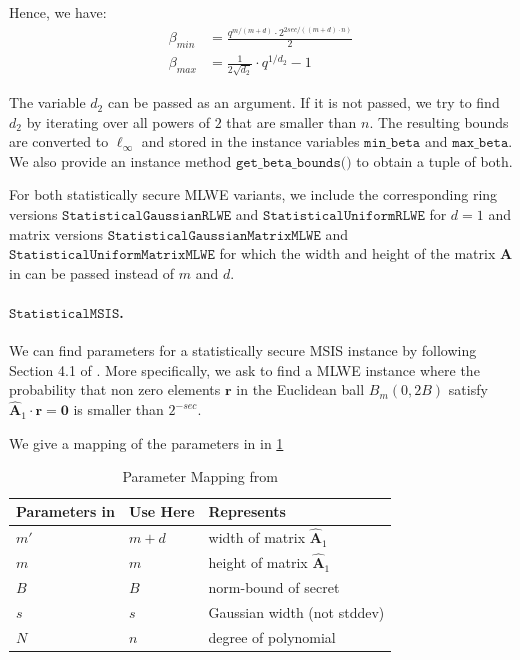 Hence, we have:
\begin{align}
    \beta_{min} & = \frac{q^{m/(m+d)} \cdot 2^{2 sec/((m+d)\cdot n)}}{2} \\
    \beta_{max} & = \frac{1}{2\sqrt{d_2}} \cdot q^{1/d_2} - 1
\end{align}

The variable $d_2$ can be passed as an argument. If it is not passed, we try to find $d_2$ by iterating over all powers of $2$ that are smaller than $n$.
The resulting bounds are converted to $\ell_\infty$ and stored in the instance variables $\texttt{min\_beta}$ and $\texttt{max\_beta}$. We also provide an instance method $\texttt{get\_beta\_bounds()}$ to obtain a tuple of both.

For both statistically secure MLWE variants, we include the corresponding ring versions $\texttt{StatisticalGaussianRLWE}$ and $\texttt{StatisticalUniformRLWE}$ for $d=1$ and matrix versions $\texttt{StatisticalGaussianMatrixMLWE}$ and $\texttt{StatisticalUniformMatrixMLWE}$ for which the width and height of the matrix $\mathbf{A}$ in \cite{LPR13} can be passed instead of $m$ and $d$. %


\paragraph{$\texttt{StatisticalMSIS}$.} We can find parameters for a statistically secure MSIS instance by following Section 4.1 of \cite{DOTT21}. More specifically, we ask to find a MLWE instance where the probability that non zero elements $\mathbf{r}$ in the Euclidean ball $B_{m}(0, 2B)$ satisfy $\hat{\mathbf{A}}_1 \cdot \mathbf{r} = \mathbf{0}$ is smaller than $2^{-sec}$. %

We give a mapping of the parameters in \cite{DOTT21} in \cref{tab:mapping-DOTT21}

\begin{table}
    \centering
    \begin{tabular}[h]{lll}
        \toprule
        Parameters in \cite{DOTT21} & Use Here & Represents                            \\\hline
        $m'$                        & $m+d$    & width of matrix $\hat{\mathbf{A}}_1$  \\
        $m$                         & $m$      & height of matrix $\hat{\mathbf{A}}_1$ \\
        $B$                         & $B$      & norm-bound of secret                  \\
        $s$                         & $s$      & Gaussian width (not stddev)           \\
        $N$                         & $n$      & degree of polynomial                  \\
        \bottomrule
    \end{tabular}
    \caption{Parameter Mapping from \cite{DOTT21}}\label{tab:mapping-DOTT21}
\end{table}


